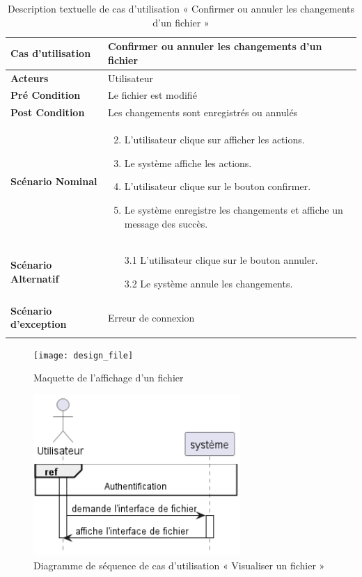 \begin{longtable}{|p{5cm}|p{10cm}|}
\hline
\textbf{Cas d'utilisation}&Confirmer ou annuler les changements d'un fichier\\
\hline
\textbf{Acteurs}&Utilisateur\\
\hline
\textbf{Pré Condition}&Le fichier est modifié\\
\hline
\textbf{Post Condition}&Les changements sont enregistrés ou annulés\\
\hline
\textbf{Scénario Nominal}&
\vspace{-\baselineskip}
\begin{enumerate}
    \setcounter{enumi}{1}
    \item L'utilisateur clique sur afficher les actions.
    \item Le système affiche les actions.
    \item L'utilisateur clique sur le bouton confirmer.
    \item Le système enregistre les changements et affiche un message des succès.
\end{enumerate}\\
\hline
\textbf{Scénario Alternatif}&
\vspace{-\baselineskip}
\begin{enumerate}
    \item [3.1]L'utilisateur clique sur le bouton annuler.
    \item [3.2]Le système annule les changements.
\end{enumerate}\\
\hline
\textbf{Scénario d'exception}&Erreur de connexion\\
\hline
\caption{Description textuelle de cas d'utilisation « Confirmer ou annuler les changements d'un fichier »}
\label{tab:description-textuelle-de-cas-d-utilisation-confirmer-ou-annuler-les-changements-d-un-fichier}
\end{longtable}


\begin{figure}[H]
  \centering
  \texttt{[image: design\_file]}
  \caption{Maquette de l'affichage d'un fichier}
  \label{fig:design_file_preview}
\end{figure}

\begin{figure}[H]
  \centering
  \includegraphics[width=0.7\textwidth]{out/diagrams/sprint4/view_file/view_file}
  \caption{Diagramme de séquence de cas d'utilisation « Visualiser un fichier   »}
  \label{fig:sequence_view_file}
\end{figure}

